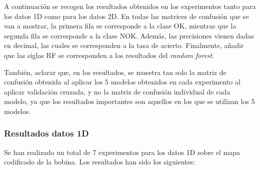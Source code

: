 A continuación se recogen los resultados obtenidos en los experimentos tanto para los datos 1D como para los datos 2D. En todas las matrices de confusión que se van a mostrar, la primera fila se corresponde a la clase OK, mientras que la segunda fila se corresponde a la clase NOK. Además, las precisiones vienen dadas en decimal, las cuales se corresponden a la tasa de acierto. Finalmente, añadir que las siglas RF se corresponden a los resultados del \emph{random forest}.

También, aclarar que, en los resultados, se muestra tan solo la matriz de confusión obtenida al aplicar los 5 modelos obtenidos en cada experimento al aplicar validación cruzada, y no la matriz de confusión individual de cada modelo, ya que los resultados importantes son aquellos en los que se utilizan los 5 modelos.
\subsubsection{Resultados datos 1D}
Se han realizado un total de 7 experimentos para los datos 1D sobre el mapa codificado de la bobina. Los resultados han sido los siguientes:

